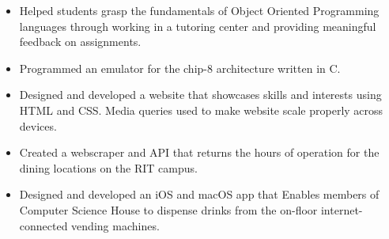 \documentclass[10pt,a4paper,ragged2e]{altacv}
\begin{document}
\begin{itemize}
    \item Helped students grasp the fundamentals of Object Oriented Programming languages through working in a tutoring center and providing meaningful feedback on assignments.
\end{itemize}


\begin{itemize}
  \item Programmed an emulator for the chip-8 architecture written in C. 
\end{itemize}

\vspace{10px}

\begin{itemize}
  \item Designed and developed a website that showcases skills and interests using HTML and CSS. Media queries used to make website scale properly across devices.
\end{itemize}

\vspace{10px}

\begin{itemize}
  \item Created a webscraper and API that returns the hours of operation for the dining locations on the RIT campus.
\end{itemize}

\vspace{10px}

\begin{itemize}
  \item Designed and developed an iOS and macOS app that Enables members of Computer Science House to dispense drinks from the on-floor internet-connected vending machines. 
\end{itemize}

\clearpage
\end{document}
